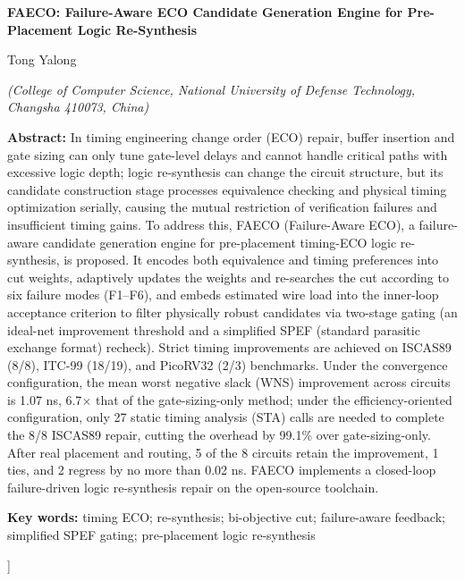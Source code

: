 \documentclass[twocolumn,10pt]{ctexart}
\begin{document}
\vspace{6pt}
\begin{center}
{\bfseries\fontsize{13.5}{18}\selectfont FAECO: Failure-Aware ECO Candidate Generation Engine for Pre-Placement Logic Re-Synthesis}\par
\vspace{5pt}
{\normalsize Tong Yalong\par}
\vspace{3pt}
{\small \itshape (College of Computer Science, National University of Defense Technology, Changsha 410073, China)}\par
\vspace{6pt}
\end{center}
\begin{flushleft}
{\bfseries Abstract:} {\small In timing engineering change order (ECO) repair, buffer insertion and gate sizing can only tune gate-level delays and cannot handle critical paths with excessive logic depth; logic re-synthesis can change the circuit structure, but its candidate construction stage processes equivalence checking and physical timing optimization serially, causing the mutual restriction of verification failures and insufficient timing gains. To address this, FAECO (Failure-Aware ECO), a failure-aware candidate generation engine for pre-placement timing-ECO logic re-synthesis, is proposed. It encodes both equivalence and timing preferences into cut weights, adaptively updates the weights and re-searches the cut according to six failure modes (F1--F6), and embeds estimated wire load into the inner-loop acceptance criterion to filter physically robust candidates via two-stage gating (an ideal-net improvement threshold and a simplified SPEF (standard parasitic exchange format) recheck). Strict timing improvements are achieved on ISCAS89 (8/8), ITC-99 (18/19), and PicoRV32 (2/3) benchmarks. Under the convergence configuration, the mean worst negative slack (WNS) improvement across circuits is 1.07 ns, 6.7$\times$ that of the gate-sizing-only method; under the efficiency-oriented configuration, only 27 static timing analysis (STA) calls are needed to complete the 8/8 ISCAS89 repair, cutting the overhead by 99.1\% over gate-sizing-only. After real placement and routing, 5 of the 8 circuits retain the improvement, 1 ties, and 2 regress by no more than 0.02 ns. FAECO implements a closed-loop failure-driven logic re-synthesis repair on the open-source toolchain.}\par
\vspace{3pt}
{\bfseries Key words:} {\small timing ECO; re-synthesis; bi-objective cut; failure-aware feedback; simplified SPEF gating; pre-placement logic re-synthesis}\par
\end{flushleft}
]%
\end{document}
